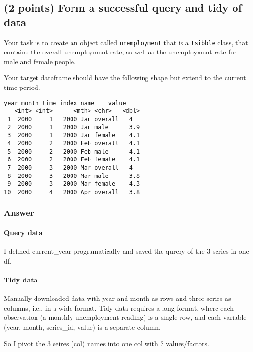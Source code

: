 \documentclass[
]{article}
\begin{document}
\subsection{(2 points) Form a successful query and tidy of
data}\label{points-form-a-successful-query-and-tidy-of-data}

Your task is to create an object called \texttt{unemployment} that is a
\texttt{tsibble} class, that contains the overall unemployment rate, as
well as the unemployment rate for male and female people.

Your target dataframe should have the following shape but extend to the
current time period.

\begin{verbatim}
year month time_index name    value
   <int> <int>      <mth> <chr>   <dbl>
 1  2000     1   2000 Jan overall   4  
 2  2000     1   2000 Jan male      3.9
 3  2000     1   2000 Jan female    4.1
 4  2000     2   2000 Feb overall   4.1
 5  2000     2   2000 Feb male      4.1
 6  2000     2   2000 Feb female    4.1
 7  2000     3   2000 Mar overall   4  
 8  2000     3   2000 Mar male      3.8
 9  2000     3   2000 Mar female    4.3
10  2000     4   2000 Apr overall   3.8
\end{verbatim}

\newpage

\subsubsection{Answer}\label{answer-8}

\paragraph{Query data}\label{query-data}

I defined current\_year programatically and saved the qurery of the 3
series in one df.

\paragraph{Tidy data}\label{tidy-data}

Manually downloaded data with year and month as rows and three series as
columns, i.e., in a wide format. Tidy data requires a long format, where
each observation (a monthly unemployment reading) is a single row, and
each variable (year, month, series\_id, value) is a separate column.

So I pivot the 3 seires (col) names into one col with 3 values/factors.
\end{document}
